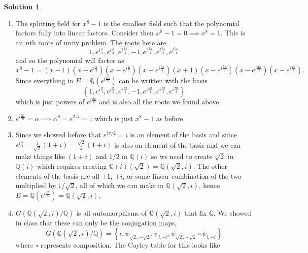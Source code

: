 \documentclass[10pt]{article}
\theoremstyle{definition}
\newtheorem{soln}{Solution}
\begin{document}
\begin{soln}~
  \begin{enumerate}[label=(\alph*)]
    \item The splitting field for $x^8-1$ is the smallest field such that the polynomial
          factors fully into linear factors. Consider then $x^8-1=0\implies x^8=1$.
          This is an $n$th roots of unity problem. The roots here are
          $$
            1,e^{i\frac{\pi}{4}},e^{i\frac{\pi}{2}}, e^{i\frac{3\pi }{4}},
            -1, e^{i\frac{5\pi}{4}}, e^{ i\frac{3\pi}{2}}, e^{i\frac{7\pi}{4}}
          $$
          and so the polynomial will factor as
          $$x^8-1=(x-1)(x-e^{i\frac{\pi}{4}})(x-e^{i\frac{\pi}{2}})(x-e^{i\frac{3\pi }{4}})
            (x+1)(x-e^{i\frac{5\pi}{4}})(x-e^{ i\frac{3\pi}{2}})(x-e^{i\frac{7\pi}{4}}).$$
          Since everything in $E=\mathbb{Q}(e^{i\frac{2\pi}{8}})$ can be written with the basis
          $$\left\{1,e^{i\frac{\pi}{4}},e^{i\frac{\pi}{2}},e^{i\frac{3\pi}{4}},-1,e^{i\frac{5\pi}{4}},
            e^{i\frac{3\pi}{2}},e^{i\frac{7\pi}{4}}
            \right\}$$
          which is just powers of $e^{i\frac{2\pi}{8}}$ and is also all the roots we found above.
    \item $e^{i\frac{2\pi}{8}}=\alpha\implies \alpha^8=e^{2\pi i}=1$ which is just $x^8-1$ as before.
    \item Since we showed before that $e^{i\pi/2}=i$ is an element of the basis and since
          $e^{i\frac{\pi}{4}}=\frac{1}{\sqrt{2}}\left(1+i\right)=\frac{\sqrt{2}}{2}\left(1+i\right)$ is also an element of the basis
          and we can make things like $(1+i)$ and $1/2$ in $\mathbb{Q}(i)$ so we need to create
          $\sqrt{2}$ in $\mathbb{Q}(i)$ which requires creating $\mathbb{Q}(i)(\sqrt{2})=\mathbb{Q}(\sqrt{2},i)$. The other elements of the
          basis are all $\pm 1$, $\pm i$, or some linear combination of the two multiplied by $1/\sqrt{2}$, all of which we can make in
          $\mathbb{Q}(\sqrt{2},i)$, hence $E=\mathbb{Q}(e^{i\frac{2\pi}{8}})=\mathbb{Q}(\sqrt{2},i)$.
    \item $G(\mathbb{Q}(\sqrt{2},i)/\mathbb{Q})$ is all automorphisms of $\mathbb{Q}(\sqrt{2},i)$ that fix $\mathbb{Q}$.
          We showed in class that these can only be the conjugation maps,
          $$G(\mathbb{Q}(\sqrt{2},i)/\mathbb{Q})=\left\{\iota, \psi_{\sqrt{2},-\sqrt{2}}, \psi_{i,-i}, \psi_{\sqrt{2},-\sqrt{2}}\circ \psi_{i,-i}\right\}$$
          where $\circ$ represents composition.
          The Cayley table for this looks like
          \begin{center}

\end{center}
\end{enumerate}
\end{soln}
\end{document}
